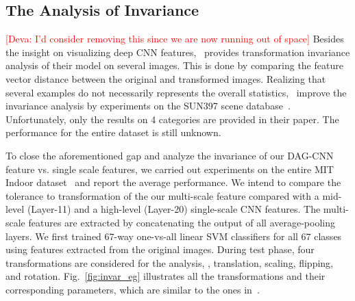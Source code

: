\documentclass[10pt,twocolumn,letterpaper]{article}
\newcommand{\deva}[1]{\textcolor{red}{[Deva: #1]}}
\begin{document}

\subsection{The Analysis of Invariance}
\deva{I'd consider removing this since we are now running out of space}
Besides the insight on visualizing deep CNN features,~\cite{visual_cnn} provides transformation invariance analysis of their model on several images. This is done by comparing the feature vector distance between the original and transformed images. Realizing that several examples do not necessarily represents the overall statistics,~\cite{Gong14} improve the invariance analysis by experiments on the SUN397 scene database~\cite{SUN397}. Unfortunately, only the results on 4 categories are provided in their paper. The performance for the entire dataset is still unknown.

To close the aforementioned gap and analyze the invariance of our DAG-CNN feature vs. single scale features, we carried out experiments on the entire MIT Indoor dataset~\cite{MIT67} and report the average performance. We intend to compare the tolerance to transformation of the our multi-scale feature compared with a mid-level (Layer-11) and a high-level (Layer-20) single-scale CNN features. The multi-scale features are extracted by concatenating the output of all average-pooling layers. We first trained $67$-way one-vs-all linear SVM classifiers for all $67$ classes using features extracted from the original images. During test phase, four transformations are considered for the analysis, \ie, translation, scaling, flipping, and rotation. Fig.~\ref{fig:invar_eg} illustrates all the transformations and their corresponding parameters, which are similar to the ones in~\cite{Gong14}. 
\end{document}
